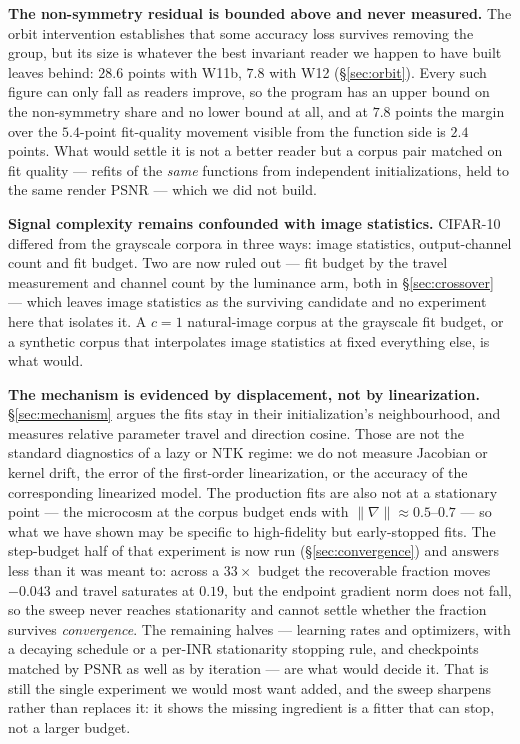 \documentclass[10pt,letterpaper]{article}
\theoremstyle{definition}
\begin{document}
\textbf{The non-symmetry residual is bounded above and never measured.} The orbit intervention
establishes that some accuracy loss survives removing the group, but its size is whatever the best
invariant reader we happen to have built leaves behind: $28.6$ points with W11b, $7.8$ with W12
(\S\ref{sec:orbit}). Every such figure can only fall as readers improve, so the program has an upper
bound on the non-symmetry share and no lower bound at all, and at $7.8$ points the margin over the
$5.4$-point fit-quality movement visible from the function side is $2.4$ points. What would settle
it is not a better reader but a corpus pair matched on fit quality --- refits of the \emph{same}
functions from independent initializations, held to the same render PSNR --- which we did not build.

\textbf{Signal complexity remains confounded with image statistics.} CIFAR-10 differed from the
grayscale corpora in three ways: image statistics, output-channel count and fit budget. Two are now
ruled out --- fit budget by the travel measurement and channel count by the luminance arm, both in
\S\ref{sec:crossover} --- which leaves image statistics as the surviving candidate and no
experiment here that isolates it. A $c=1$ natural-image corpus at the grayscale fit budget, or a
synthetic corpus that interpolates image statistics at fixed everything else, is what would.

\textbf{The mechanism is evidenced by displacement, not by linearization.} \S\ref{sec:mechanism}
argues the fits stay in their initialization's neighbourhood, and measures relative parameter travel
and direction cosine. Those are not the standard diagnostics of a lazy or NTK regime: we do not
measure Jacobian or kernel drift, the error of the first-order linearization, or the accuracy of the
corresponding linearized model. The production fits are also not at a stationary point --- the
microcosm at the corpus budget ends with $\|\nabla\|\approx0.5$--$0.7$ --- so what we have shown may
be specific to high-fidelity but early-stopped fits. The step-budget half of that experiment is now
run (\S\ref{sec:convergence}) and answers less than it was meant to: across a $33\times$ budget the
recoverable fraction moves $-0.043$ and travel saturates at $0.19$, but the endpoint gradient norm
does not fall, so the sweep never reaches stationarity and cannot settle whether the fraction
survives \emph{convergence}. The remaining halves --- learning rates and optimizers, with a decaying
schedule or a per-INR stationarity stopping rule, and checkpoints matched by PSNR as well as by
iteration --- are what would decide it. That is still the single experiment we would most want
added, and the sweep sharpens rather than replaces it: it shows the missing ingredient is a fitter
that can stop, not a larger budget.
\end{document}
